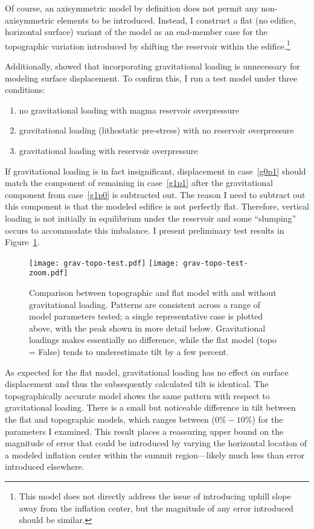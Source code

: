 Of course, an axisymmetric model by definition does not permit any non-axisymmetric elements to be introduced. Instead, I construct a flat (no edifice, horizontal surface) variant of the model as an end-member case for the topographic variation introduced by shifting the reservoir within the edifice.\footnote{This model does not directly address the issue of introducing uphill slope away from the inflation center, but the magnitude of any error introduced should be similar.}

Additionally, \textcite{grosfils_magma_2007} showed that incorporating gravitational loading is unnecessary for modeling surface displacement. To confirm this, I run a test model under three conditions:
\begin{enumerate}
    \item no gravitational loading with magma reservoir overpressure \label{g0p1}
    \item gravitational loading (lithostatic pre-stress) with no reservoir overpressure\label{g1p0}
    \item gravitational loading with reservoir overpressure \label{g1p1}
\end{enumerate}
If gravitational loading is in fact insignificant, displacement in case~\ref{g0p1} should match the component of remaining in case~\ref{g1p1} after the gravitational component from case~\ref{g1p0} is subtracted out. The reason I need to subtract out this component is that the modeled edifice is not perfectly flat. Therefore, vertical loading is not initially in equilibrium under the reservoir and some ``slumping'' occurs to accommodate this imbalance. I present preliminary test results in Figure~\ref{fig:grav-topo-test}.

\begin{figure}
    \texttt{[image: grav-topo-test.pdf]}
    \texttt{[image: grav-topo-test-zoom.pdf]}%
    \caption[Numerical model sensitivity to topography and gravity]{Comparison between topographic and flat model with and without gravitational loading. Patterns are consistent across a range of model parameters tested; a single representative case is plotted above, with the peak shown in more detail below. Gravitational loadings makes essentially no difference, while the flat model (topo = False) tends to underestimate tilt by a few percent.}%
    \label{fig:grav-topo-test}%
\end{figure}

As expected for the flat model, gravitational loading has no effect on surface displacement and thus the subsequently calculated tilt is identical. The topographically accurate model shows the same pattern with respect to gravitational loading. There is a small but noticeable difference in tilt between the flat and topographic models, which ranges between ($0\%-10\%$) for the parameters I examined. This result places a reassuring upper bound on the magnitude of error that could be introduced by varying the horizontal location of a modeled inflation center within the summit region---likely much less than error introduced elsewhere.

